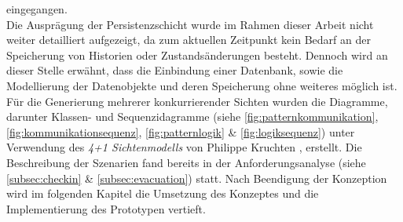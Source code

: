     eingegangen. 
    \\
    Die Ausprägung der Persistenzschicht wurde im Rahmen dieser Arbeit nicht weiter detailliert aufgezeigt, da zum aktuellen Zeitpunkt 
    kein Bedarf an der Speicherung von Historien oder Zustandsänderungen besteht. Dennoch wird an dieser Stelle erwähnt, dass die Einbindung einer 
    Datenbank, sowie die Modellierung der Datenobjekte und deren Speicherung ohne weiteres möglich ist. 
\\
\linebreak
Für die Generierung mehrerer konkurrierender Sichten wurden die Diagramme, darunter Klassen- und Sequenzidagramme 
(siehe \ref{fig:patternkommunikation}, \ref{fig:kommunikationsequenz}, \ref{fig:patternlogik} \& \ref{fig:logiksequenz}) 
unter Verwendung des \textit{4+1 Sichtenmodells} von Philippe Kruchten \cite{Kruchten1995}, erstellt. 
Die Beschreibung der Szenarien fand bereits in der Anforderungsanalyse (siehe \ref{subsec:checkin} \& \ref{subsec:evacuation}) statt. 
Nach Beendigung der Konzeption wird im folgenden Kapitel die Umsetzung des Konzeptes und die 
Implementierung des Prototypen vertieft. 

